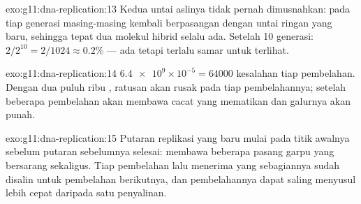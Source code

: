 \begin{solution}{exo:g11:dna-replication:13}
Kedua untai aslinya tidak pernah dimusnahkan: pada tiap generasi
masing-masing kembali berpasangan dengan untai ringan yang baru,
sehingga tepat dua molekul hibrid selalu ada. Setelah 10 generasi: $2/2^{10} = 2/1024
\approx 0.2\%$ --- ada tetapi terlalu samar untuk terlihat.
\end{solution}

\begin{solution}{exo:g11:dna-replication:14}
$\num{6.4e9} \times 10^{-5} = \num{64000}$ kesalahan tiap pembelahan.
Dengan dua puluh ribu , ratusan  akan rusak pada tiap
pembelahannya; setelah beberapa pembelahan  akan membawa cacat
yang mematikan dan galurnya akan punah.
\end{solution}

\begin{solution}{exo:g11:dna-replication:15}
Putaran replikasi yang baru mulai pada titik awalnya sebelum putaran
sebelumnya selesai:  membawa beberapa pasang garpu yang
bersarang sekaligus. Tiap pembelahan lalu menerima  yang
sebagiannya sudah disalin untuk pembelahan berikutnya, dan
pembelahannya dapat saling menyusul lebih cepat daripada satu penyalinan.
\end{solution}

